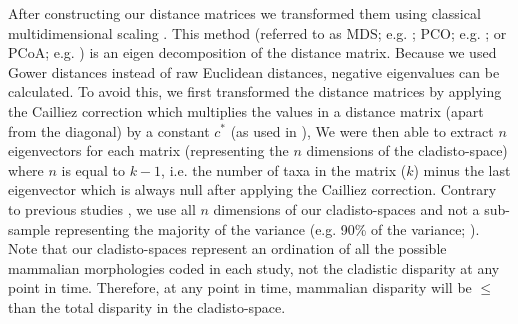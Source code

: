 \documentclass[12pt,letterpaper]{article}
\renewcommand{\subsubsection}[1]{%
\vspace{2ex}
\noindent
\textit{#1.}---}
\begin{document}
After constructing our distance matrices we transformed them using classical multidimensional scaling \citep[MDS;][]{torgerson1965multidimensional,GOWER01121966,cailliez1983analytical}.
This method (referred to as MDS; e.g. \citealt{DonohueDim}; PCO; e.g. \citealt{Brusatte2015}; or PCoA; e.g. \citealt{paradisape:2004}) is an eigen decomposition of the distance matrix.
Because we used Gower distances instead of raw Euclidean distances, negative eigenvalues can be calculated.
To avoid this, we first transformed the distance matrices by applying the Cailliez correction \citep{cailliez1983analytical} which multiplies the values in a distance matrix (apart from the diagonal) by a constant $c^*$ (as used in \citealt{toljagictriassic-jurassic2013}), 
We were then able to extract $n$ eigenvectors for each matrix (representing the $n$ dimensions of the cladisto-space) where $n$ is equal to $k-1$, i.e. the number of taxa in the matrix ($k$) minus the last eigenvector which is always null after applying the Cailliez correction.
Contrary to previous studies \citep{brusatte50,cisneros2010,prentice2011,anderson2012using,Hughes20082013,bentonmodels2014}, we use all $n$ dimensions of our cladisto-spaces and not a sub-sample representing the majority of the variance 
(e.g. 90\% of the variance; \citealt{Brusatte12092008,toljagictriassic-jurassic2013}).
Note that our cladisto-spaces represent an ordination of all the possible mammalian morphologies coded in each study, not the cladistic disparity at any point in time. %
Therefore, at any point in time, mammalian disparity will be $\leq$ than the total disparity in the cladisto-space. %
\end{document}
